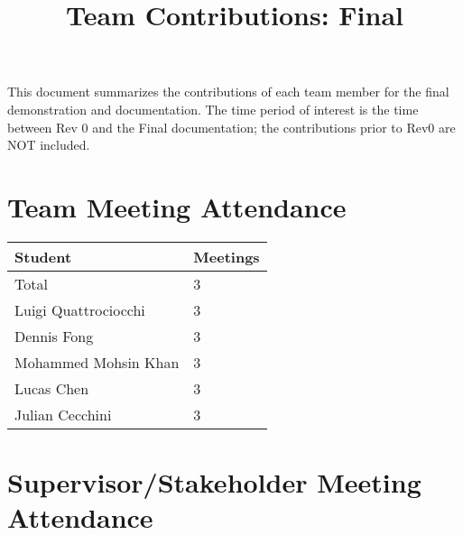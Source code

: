 \documentclass{article}
\title{Team Contributions: Final\\\progname}
\author{\authname}
\date{}
\begin{document}
\maketitle

This document summarizes the contributions of each team member for the final
demonstration and documentation.  The time period of interest is the time
between Rev 0 and the Final documentation; the contributions prior to Rev0 are
NOT included.

\section{Team Meeting Attendance}


\begin{table}[H]
\centering
\begin{tabular}{ll}
\toprule
\textbf{Student} & \textbf{Meetings}\\
\midrule
Total & 3\\
Luigi Quattrociocchi & 3\\
Dennis Fong & 3\\
Mohammed Mohsin Khan & 3\\
Lucas Chen & 3\\
Julian Cecchini & 3\\
\end{tabular}
\end{table}


\section{Supervisor/Stakeholder Meeting Attendance}

\end{document}
